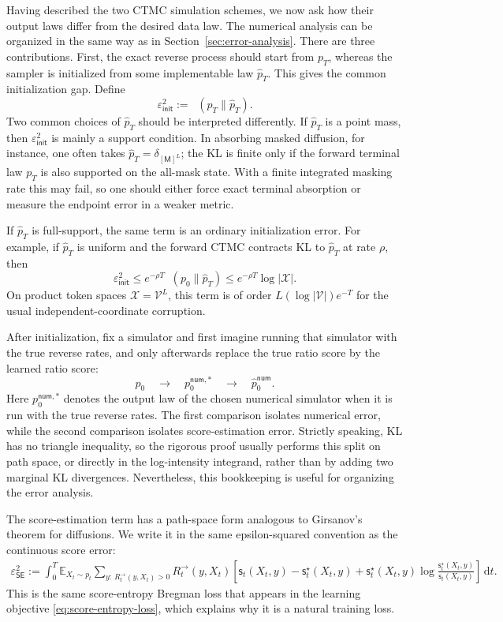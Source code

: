 \documentclass[10pt,a4paper]{amsart}
\numberwithin{equation}{section}
\DeclareMathOperator{\KL}{D_{\mathsf{KL}}}
\newcommand{\E}{\mathbb{E}}
\newcommand{\dd}{\,\mathrm{d}}
\newcommand{\cX}{\mathcal{X}}
\newcommand{\mc}[1]{\mathcal{#1}}
\newcommand{\wh}[1]{\widehat{#1}}
\newcommand{\sstar}{\mathsf{s}^{\star}}
\newcommand{\score}{\mathsf{s}}
\newcommand{\epsinit}{\varepsilon_{\mathsf{init}}}
\newcommand{\epsSE}{\varepsilon_{\mathsf{SE}}}
\begin{document}
Having described the two CTMC simulation schemes, we now ask how their output
laws differ from the desired data law.
The numerical analysis can be organized in the same way as in
Section~\ref{sec:error-analysis}.  There are three contributions.  First, the
exact reverse process should start from $p_T$, whereas the sampler is initialized
from some implementable law $\wh p_T$.  This gives the common initialization
gap.  Define
\[
    \epsinit^2:=\KL(p_T\|\wh p_T).
\]
Two common choices of $\wh p_T$ should be interpreted differently.  If
$\wh p_T$ is a point mass, then $\epsinit^2$ is mainly a support condition.  In
absorbing masked diffusion, for instance, one often takes
$\wh p_T=\delta_{[\mathsf M]^L}$; the KL is finite only if the forward terminal
law $p_T$ is also supported on the all-mask state.  With a finite integrated
masking rate this may fail, so one should either force exact terminal
absorption or measure the endpoint error in a weaker metric.

If $\wh p_T$ is full-support, the same term is an ordinary initialization
error.  For example, if $\wh p_T$ is uniform and the forward CTMC contracts KL
to $\wh p_T$ at rate $\rho$, then
\[
    \epsinit^2
    \leq e^{-\rho T}\KL(p_0\|\wh p_T)
    \leq e^{-\rho T}\log|\cX|.
\]
On product token spaces $\cX=\mc{V}^L$, this term is of order
$L(\log|\mc{V}|)e^{-T}$ for the usual independent-coordinate corruption.

After initialization, fix a simulator and first imagine running that simulator
with the true reverse rates, and only afterwards replace the true ratio score by
the learned ratio score:
\[
    p_0
    \quad\longrightarrow\quad
    p_0^{\mathsf{num},*}
    \quad\longrightarrow\quad
    \wh p_0^{\mathsf{num}}.
\]
Here $p_0^{\mathsf{num},*}$ denotes the output law of the chosen numerical
simulator when it is run with the true reverse rates.  The first comparison
isolates numerical error, while the second comparison isolates score-estimation
error.  Strictly speaking, KL has no triangle inequality, so the rigorous proof
usually performs this split on path space, or directly in the log-intensity
integrand, rather than by adding two marginal KL divergences.  Nevertheless,
this bookkeeping is useful for organizing the error analysis.

The score-estimation term has a path-space form analogous to Girsanov's theorem
for diffusions.  We write it in the same epsilon-squared convention as the
continuous score error:
\begin{align}\label{eq:ctmc-score-entropy-error}
    \epsSE^2
    :=
    \int_0^T
    \E_{X_t\sim p_t}
    \sum_{y:\,R_t^{\to}(y,X_t)>0}
    R_t^{\to}(y,X_t)
    \left[
    \score_t(X_t,y)
    -\sstar_t(X_t,y)
    +\sstar_t(X_t,y)
    \log
    \frac{\sstar_t(X_t,y)}{\score_t(X_t,y)}
    \right]\dd t.
\end{align}
This is the same score-entropy Bregman loss that appears in the learning
objective \eqref{eq:score-entropy-loss}, which explains why it is a natural
training loss.
\end{document}
